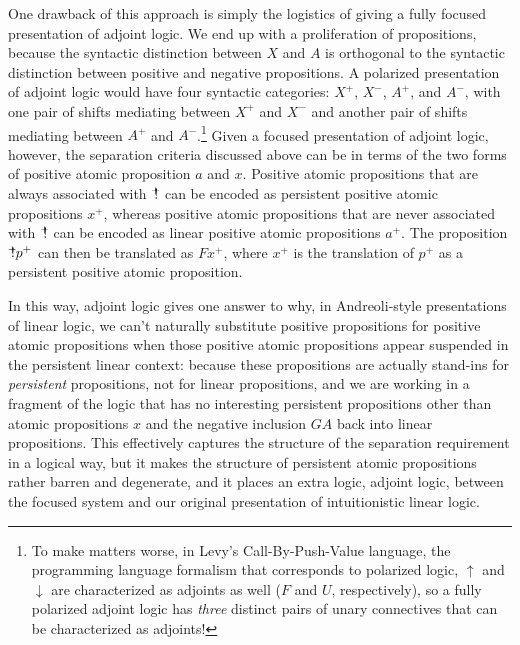 One drawback of this approach is simply the logistics of giving 
a fully focused presentation
of adjoint logic. We end up with a proliferation of propositions,
because the syntactic distinction between $X$ and $A$ is orthogonal to
the syntactic distinction between positive and negative
propositions. A polarized presentation of adjoint logic would have
four syntactic categories: $X^+$, $X^-$, $A^+$, and $A^-$, with one
pair of shifts mediating between $X^+$ and $X^-$ and another pair of
shifts mediating between $A^+$ and $A^-$.\footnote{To make matters
  worse, in Levy's Call-By-Push-Value language, the programming
  language formalism that corresponds to polarized logic, ${\uparrow}$
  and ${\downarrow}$ are characterized as adjoints as well ($F$ and
  $U$, respectively), so a fully polarized adjoint logic has {\it
    three} distinct pairs of unary connectives that can be
  characterized as adjoints!}
Given a focused presentation of adjoint logic, however, 
the separation criteria discussed above can be
in terms of the two forms of positive atomic proposition $a$ and $x$. 
Positive atomic propositions that are always associated with
${\mbox{\hspace{2pt}$\mathbb !$\hspace{-5pt}$^+$\hspace{-1pt}}}$ can be encoded as persistent positive atomic
propositions $x^+$, whereas positive atomic propositions that are never
associated with ${\mbox{\hspace{2pt}$\mathbb !$\hspace{-5pt}$^+$\hspace{-1pt}}}$ can be encoded as linear positive atomic
propositions $a^+$. The proposition ${\mbox{\hspace{2pt}$\mathbb !$\hspace{-5pt}$^+$\hspace{-1pt}}}p^+$ can then be
translated as $F x^+$, where $x^+$ is the translation of $p^+$ as a
persistent positive atomic proposition.

In this way, adjoint logic gives one answer to why, in Andreoli-style
presentations of linear logic,
we can't naturally substitute positive propositions for positive
atomic propositions when those positive atomic propositions appear
suspended in the persistent linear context: because these propositions
are actually stand-ins for {\it persistent} propositions, not for
linear propositions, and we are working in a fragment of the logic
that has no interesting persistent propositions other than atomic
propositions $x$ and the negative inclusion $G A$ back into linear
propositions. 
This effectively captures the structure of the separation requirement
in a logical way, but it makes the structure of persistent atomic
propositions rather barren and degenerate, and it places an extra
logic, adjoint logic, between the focused system and our original 
presentation of intuitionistic linear logic.

